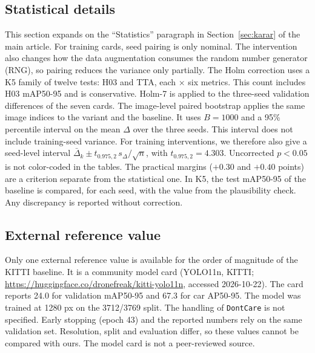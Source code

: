 \subsection{Statistical details}\label{sec:ek-istatistik}
This section expands on the ``Statistics'' paragraph in Section~\ref{sec:karar} of the main article. For training cards, seed pairing is only nominal. The intervention also changes how the data augmentation consumes the random number generator (RNG), so pairing reduces the variance only partially. The Holm correction \cite{holm_1979_sequential} uses a K5 family of twelve tests: H03 and TTA, each $\times$ six metrics. This count includes H03 mAP50-95 and is conservative. Holm-7 is applied to the three-seed validation differences of the seven cards. The image-level paired bootstrap \cite{efron_1979_bootstrap} applies the same image indices to the variant and the baseline. It uses $B=1000$ and a 95\% percentile interval on the mean $\Delta$ over the three seeds. This interval does not include training-seed variance. For training interventions, we therefore also give a seed-level interval $\bar\Delta_k\pm t_{0.975,2}\,s_\Delta/\sqrt n$, with $t_{0.975,2}=4.303$. Uncorrected $p<0.05$ is not color-coded in the tables. The practical margins ($+0.30$ and $+0.40$ points) are a criterion separate from the statistical one. In K5, the test mAP50-95 of the baseline is compared, for each seed, with the value from the plausibility check. Any discrepancy is reported without correction.

\subsection{External reference value}\label{sec:ek-dis}
Only one external reference value is available for the order of magnitude of the KITTI baseline. It is a community model card (YOLO11n, KITTI; \url{https://huggingface.co/dronefreak/kitti-yolo11n}, accessed 2026-10-22). The card reports 24.0 for validation mAP50-95 and 67.3 for car AP50-95. The model was trained at 1280 px on the 3712/3769 split. The handling of \texttt{DontCare} is not specified. Early stopping (epoch 43) and the reported numbers rely on the same validation set. Resolution, split and evaluation differ, so these values cannot be compared with ours. The model card is not a peer-reviewed source.

\FloatBarrier
